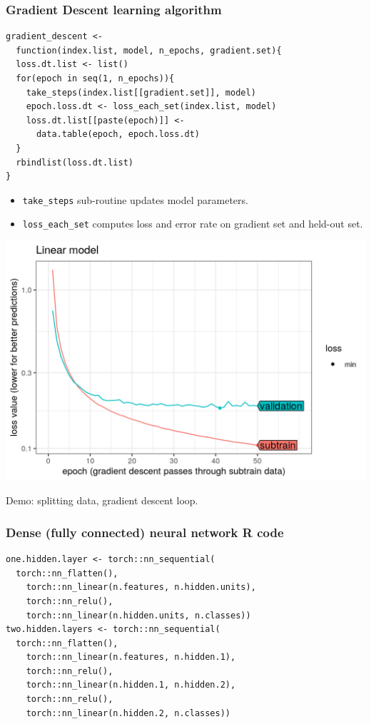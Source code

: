 \documentclass{beamer}
\begin{document}
\begin{frame}[fragile]
  \frametitle{Gradient Descent learning algorithm}
\begin{verbatim}
gradient_descent <- 
  function(index.list, model, n_epochs, gradient.set){
  loss.dt.list <- list()
  for(epoch in seq(1, n_epochs)){
    take_steps(index.list[[gradient.set]], model)
    epoch.loss.dt <- loss_each_set(index.list, model)
    loss.dt.list[[paste(epoch)]] <- 
      data.table(epoch, epoch.loss.dt)
  }
  rbindlist(loss.dt.list)
}
\end{verbatim}
  \begin{itemize}
  \item \verb|take_steps| sub-routine updates model parameters.
  \item \verb|loss_each_set| computes loss and error rate on gradient set
    and held-out set.
  \end{itemize}
\end{frame}
 
\begin{frame}
  \includegraphics[width=\textwidth]{figure-validation-loss-linear}

  Demo: splitting data, gradient descent loop.
\end{frame}
 
\begin{frame}[fragile]
  \frametitle{Dense (fully connected) neural network R code}

\begin{verbatim}
one.hidden.layer <- torch::nn_sequential(
  torch::nn_flatten(),
    torch::nn_linear(n.features, n.hidden.units),
    torch::nn_relu(),
    torch::nn_linear(n.hidden.units, n.classes))
two.hidden.layers <- torch::nn_sequential(
  torch::nn_flatten(),
    torch::nn_linear(n.features, n.hidden.1),
    torch::nn_relu(),
    torch::nn_linear(n.hidden.1, n.hidden.2),
    torch::nn_relu(),
    torch::nn_linear(n.hidden.2, n.classes))
\end{verbatim}

\end{frame}
\end{document}
